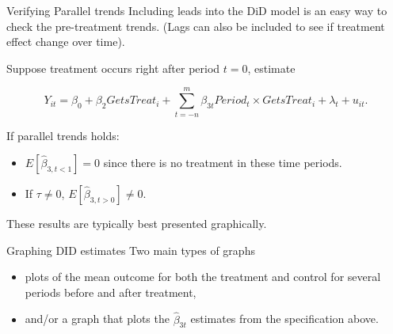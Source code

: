 \documentclass[
  ignorenonframetext,
]{beamer}
\begin{document}
\begin{frame}{Verifying Parallel trends}
\protect\hypertarget{verifying-parallel-trends-1}{}
Including leads into the DiD model is an easy way to check the
pre-treatment trends. (Lags can also be included to see if treatment
effect change over time).

Suppose treatment occurs right after period \(t=0\), estimate

\[
Y_{it}=\beta_0+\beta_2GetsTreat_i+\sum_{t=-n}^m\beta_{3t}Period_t \times GetsTreat_i+\lambda_t+u_{it}.
\]

If parallel trends holds:

\begin{itemize}
\item
  \(E[\hat{\beta}_{3,t<1}]=0\) since there is no treatment in these time
  periods.
\item
  If \(\tau\neq0\), \(E[\hat{\beta}_{3,t>0}]\neq0\).
\end{itemize}

These results are typically best presented graphically.
\end{frame}

\begin{frame}{Graphing DID estimates}
\protect\hypertarget{graphing-did-estimates}{}
Two main types of graphs

\begin{itemize}
\item
  plots of the mean outcome for both the treatment and control for
  several periods before and after treatment,
\item
  and/or a graph that plots the \(\hat{\beta}_{3t}\) estimates from the
  specification above.
\end{itemize}
\end{frame}
\end{document}
